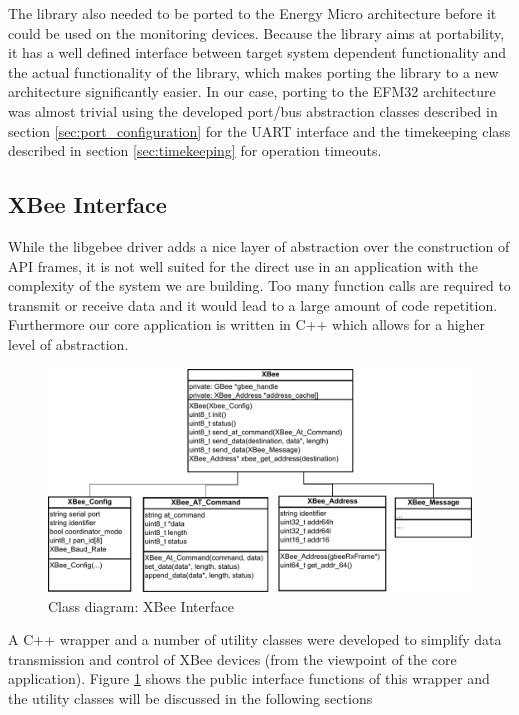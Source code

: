 The library also needed to be ported to the Energy Micro architecture before it could be used on the monitoring devices. Because the library aims at portability, it has a well defined interface between target system dependent functionality and the actual functionality of the library, which makes porting the library to a new architecture significantly easier. In our case, porting to the EFM32 architecture was almost trivial using the developed port/bus abstraction classes described in section \ref{sec:port_configuration} for the UART interface and the timekeeping class described in section \ref{sec:timekeeping} for operation timeouts.


\subsection{XBee Interface}
While the libgebee driver adds a nice layer of abstraction over the construction of API frames, it is not well suited for the direct use in an application with the complexity of the system we are building. Too many function calls are required to transmit or receive data and it would lead to a large amount of code repetition.  Furthermore our core application is written in C++ which allows for a higher level of abstraction.

\begin{figure}
\centering
\includegraphics[width=\textwidth]{Images/xbee_interface}
\caption{Class diagram: XBee Interface}
\label{fig:xbee_interface}
\end{figure}

A C++ wrapper and a number of utility classes were developed to simplify data transmission and control of XBee devices (from the viewpoint of the core application). Figure \ref{fig:xbee_interface} shows the public interface functions of this wrapper and the utility classes will be discussed in the following sections

